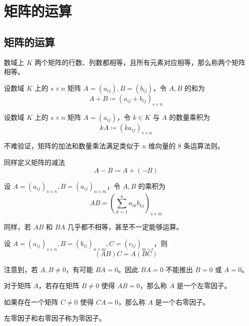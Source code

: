 
\chapter{矩阵的运算}

\section{矩阵的运算}

数域上 $K$ 两个矩阵的行数、列数都相等，且所有元素对应相等，那么称两个矩阵相等。

\begin{definition}
    设数域 $K$ 上的 $s \times n$ 矩阵 $A=(a_{ij}),B=(b_{ij})$，令 $A,B$ 的和为
    \[A + B \coloneqq  (a_{ij}+b_{ij})_{s \times n}\]
\end{definition}

\begin{definition}
    设数域 $K$ 上的 $s \times n$ 矩阵 $A=(a_{ij})$，令 $k\in K$ 与 $A$ 的数量乘积为
    \[kA \coloneqq  (ka_{ij})_{s \times n}\]
\end{definition}

不难验证，矩阵的加法和数量乘法满足类似于 $n$ 维向量的 8 条运算法则。

同样定义矩阵的减法
\[A - B \coloneqq  A + (-B)\]

\begin{definition}
    设 $A=(a_{ij})_{s \times n},B=(a_{ij})_{n \times m}$，令 $A,B$ 的乘积为
    \[AB = \left(\sum_{k=1}^na_{ik}b_{kj}\right)_{s \times m}\]
\end{definition}

同样，若 $AB$ 和 $BA$ 几乎都不相等，甚至不一定能够运算。

\begin{theorem}
    设 $A = (a_{ij})_{s \times n},  B = (b_{ij})_{n \times m},C = (c_{ij})_{m \times r}$，则
    \[(AB)C = A(BC)\]
\end{theorem}

注意到，若 $A,B\ne 0$，有可能 $BA = 0$。因此 $BA = 0$ 不能推出 $B=0$ 或 $A=0$。

\begin{definition}[零因子]
    对于矩阵 $A$，若存在矩阵 $B\ne 0$ 使得 $AB = 0$，那么称 $A$ 是一个左零因子。
    
    如果存在一个矩阵 $C\ne 0$ 使得 $CA = 0$，那么称 $A$ 是一个右零因子。
    
    左零因子和右零因子称为零因子。 
\end{definition}

